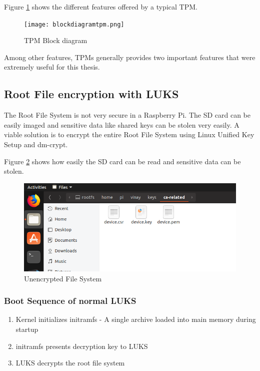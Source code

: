 \documentclass[11pt,openright]{report}
\begin{document}
Figure \ref{fig:blockdiagramtpm} shows the different features offered by a typical TPM.
\begin{figure}
	\centering
	\texttt{[image: blockdiagramtpm.png]}
	\caption{TPM Block diagram}
	\label{fig:blockdiagramtpm}
\end{figure}

Among other features, TPMs generally provides two important features that were extremely useful for this thesis.
\subsection{Root File encryption with LUKS}
The Root File System is not very secure in a Raspberry Pi. The SD card can be easily imaged and sensitive data like shared keys can be stolen very easily. A viable solution is to encrypt the entire Root File System using Linux Unified Key Setup and dm-crypt.

Figure \ref{fig:normal_fs} shows how easily the SD card can be read and sensitive data can be stolen.

\begin{figure}
    \centering
    \includegraphics[scale=1]{images/3_NormalFS.png}
    \caption{Unencrypted File System}
    \label{fig:normal_fs}
\end{figure}


\subsubsection{Boot Sequence of normal LUKS}
\renewcommand{\theenumi}{\roman{enumi}}%
\begin{enumerate}
	\item Kernel initializes initramfs - A single archive loaded into main memory during startup
	\item initramfs presents decryption key to LUKS
	\item LUKS decrypts the root file system
\end{enumerate}
\end{document}
